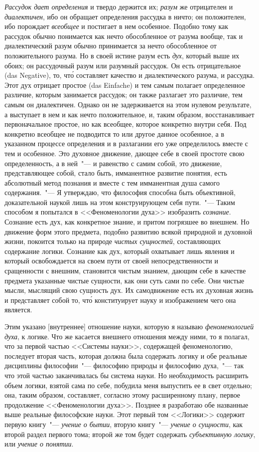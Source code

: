 \emph{Рассудок дает определения} и твердо держится их;
\emph{разум} же отрицателен и \emph{диалектичен}, ибо он обращает
определения рассудка в ничто; он положителен, ибо порождает
\emph{всеобщее} и постигает в нем особенное. Подобно
тому как рассудок обычно понимается как нечто обособленное
от разума вообще, так и диалектический разум
обычно принимается за нечто обособленное от положительного
разума. Но в своей истине разум есть \emph{дух}, который
выше их обоих; он рассудочный разум или разумный
рассудок. Он есть отрицательное (das Negative), то,
чт\'о составляет качество и диалектического разума, и рассудка.
Этот дух отрицает простое (das Einfache) и тем
самым полагает определенное различие, которым занимается
рассудок; он также разлагает это различие, тем
самым он диалектичен. Однако он не задерживается на
этом нулевом результате, а выступает в нем и как нечто
положительное, и, таким образом, восстанавливает первоначальное
простое, но как всеобщее, которое конкретно
внутри себя. Под конкретно всеобщее не подводится то
или другое данное особенное, а в указанном процессе
определения и в разлагании его уже определилось вместе
с тем и особенное. Это духовное движение, дающее
себе в своей простоте свою определенность, а в ней~"--- и
равенство с самим собой, это движение, представляющее
собой, стало быть, имманентное развитие понятия, есть
абсолютный метод познания и вместе с тем имманентная
душа самого содержания.~"--- Я утверждаю, что философия
способна быть объективной, доказательной наукой лишь
на этом конструирующем себя пути.~"--- Таким способом
я попытался в <<Феноменологии духа>> изобразить \emph{сознание}.
Сознание есть дух, как конкретное знание, и притом
погрязшее во внешнем. Но движение форм этого
предмета, подобно развитию всякой природной и духовной
жизни, покоится только на природе \emph{чистых сущностей},
составляющих содержание логики. Сознание как
дух, который охватывает лишь явления и который освобождается
на своем пути от своей непосредственности и
сращенности с внешним, становится чистым знанием,
дающим себе в качестве предмета указанные чистые
сущности, как они суть сами по себе. Они чистые мысли,
мыслящий свою сущность дух. Их самодвижение есть
их духовная жизнь и представляет собой то, чт\'о конституирует
науку и изображением чего она является.

Этим указано [внутреннее] отношение науки, которую
я называю \emph{феноменологией духа}, к логике. Что же касается
внешнего отношения между ними, то я полагал,
что за первой частью <<Системы науки>>\footnotemark{}, содержащей
феноменологию, последует вторая часть, которая должна
была содержать логику и обе реальные дисциплины
философии~"--- философию природы и философию духа,~"---
так что этой частью заканчивалась бы система науки.
Но необходимость расширить объем логики, взятой сама
по себе, побудила меня выпустить ее в свет отдельно;
она, таким образом, составляет, согласно этому расширенному
плану, первое продолжение <<Феноменологии
духа>>. Позднее я разработаю обе названные выше реальные
философские науки. Этот первый том <<Логики>> содержит
первую книгу~"--- \emph{учение о бытии}, вторую книгу~"---
\emph{учение о сущности}, как второй раздел первого тома; второй
же том будет содержать \emph{субъективную логику}, или
\emph{учение о понятии}.

